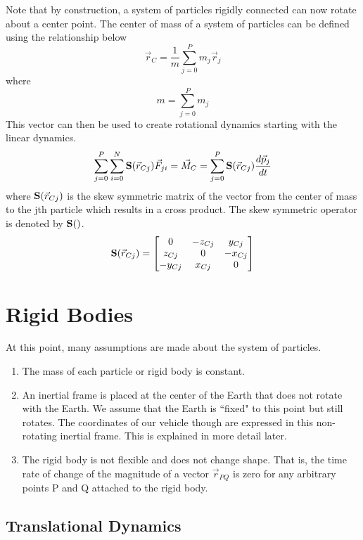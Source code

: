 \documentclass{article}
\begin{document}
Note that by construction, a system of particles rigidly connected can
now rotate about a center point. The center of mass of a system of
particles can be defined using the relationship below
\begin{equation}
\vec{r}_C = \frac{1}{m}\sum\limits_{j=0}^P m_j\vec{r}_{j}
\end{equation}
where
\begin{equation}
m = \sum\limits_{j=0}^P m_j
\end{equation}
This vector can then be used to create rotational dynamics starting
with the linear dynamics.
\begin{equation}
\sum\limits_{j=0}^P \sum\limits_{i=0}^N {\bf S}(\vec{r}_{Cj}) \vec{F}_{ji}  = \vec{M}_C = \sum\limits_{j=0}^P {\bf
  S}(\vec{r}_{Cj}) \frac{d\vec{p}_j}{dt}
\end{equation}
where ${\bf S}(\vec{r}_{Cj})$ is the skew symmetric matrix of the
vector from the center of mass to the jth particle which results in a
cross product. The skew symmetric operator is denoted by ${\bf
  S}()$. 
\begin{equation}
{\bf S}(\vec{r}_{Cj}) = \begin{bmatrix} 0 & -z_{Cj} & y_{Cj} \\ z_{Cj} & 0 &
  -x_{Cj} \\ -y_{Cj} & x_{Cj} & 0 \end{bmatrix}
\end{equation}
\section{Rigid Bodies}
At this point, many assumptions are made about the
system of particles.
\begin{enumerate}
\item The mass of each particle or rigid body is constant.
\item An inertial frame is placed at the center of the Earth that does
  not rotate with the Earth. We assume that the Earth is ``fixed" to
  this point but still rotates. The coordinates of our vehicle
  though are expressed in this non-rotating inertial frame. This is
  explained in more detail later.
\item The rigid body is not flexible and does not change shape. That
  is, the time rate of change of the magnitude of a vector
  $\vec{r}_{PQ}$ is zero for any arbitrary points P and Q attached to
  the rigid body.
\end{enumerate}

\subsection{Translational Dynamics}
\end{document}
